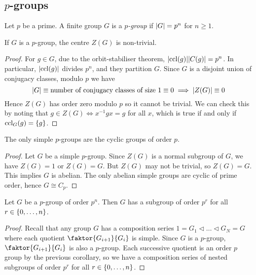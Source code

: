 \subsection{\( p \)-groups}
\begin{definition}
	Let \( p \) be a prime.
	A finite group \( G \) is a \textit{\( p \)-group} if \( \abs{G} = p^n \) for \( n \geq 1 \).
\end{definition}
\begin{theorem}
	If \( G \) is a \( p \)-group, the centre \( Z(G) \) is non-trivial.
\end{theorem}
\begin{proof}
	For \( g \in G \), due to the orbit-stabiliser theorem, \( \abs{\operatorname{ccl}(g)} \abs{C(g)} = p^n \).
	In particular, \( \abs{\operatorname{ccl}(g)} \) divides \( p^n \), and they partition \( G \).
	Since \( G \) is a disjoint union of conjugacy classes, modulo \( p \) we have
	\[
		\abs{G} \equiv \text{number of conjugacy classes of size } 1 \equiv 0 \implies \abs{Z(G)} \equiv 0
	\]
	Hence \( Z(G) \) has order zero modulo \( p \) so it cannot be trivial.
	We can check this by noting that \( g \in Z(G) \iff x^{-1} g x = g \) for all \( x \), which is true if and only if \( \operatorname{ccl}_G(g) = \qty{g} \).
\end{proof}
\begin{corollary}
	The only simple \( p \)-groups are the cyclic groups of order \( p \).
\end{corollary}
\begin{proof}
	Let \( G \) be a simple \( p \)-group.
	Since \( Z(G) \) is a normal subgroup of \( G \), we have \( Z(G) = 1 \) or \( Z(G) = G \).
	But \( Z(G) \) may not be trivial, so \( Z(G) = G \).
	This implies \( G \) is abelian.
	The only abelian simple groups are cyclic of prime order, hence \( G \cong C_p \).
\end{proof}
\begin{corollary}
	Let \( G \) be a \( p \)-group of order \( p^n \).
	Then \( G \) has a subgroup of order \( p^r \) for all \( r \in \qty{0, \dots, n} \).
\end{corollary}
\begin{proof}
	Recall that any group \( G \) has a composition series \( 1 = G_1 \triangleleft \dots \triangleleft G_N = G \) where each quotient \( \faktor{G_{i+1}}{G_i} \) is simple.
	Since \( G \) is a \( p \)-group, \( \faktor{G_{i+1}}{G_i} \) is also a \( p \)-group.
	Each successive quotient is an order \( p \) group by the previous corollary, so we have a composition series of nested subgroups of order \( p^r \) for all \( r \in \qty{0, \dots, n} \).
\end{proof}

